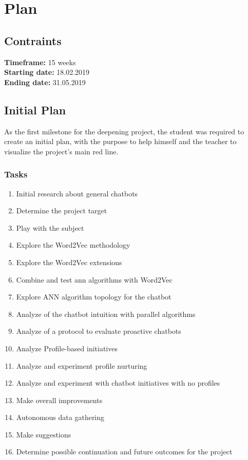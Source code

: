 \chapter{Plan}


\section{Contraints}
\textbf{Timeframe:} 15 weeks\\
\textbf{Starting date:} 18.02.2019\\
\textbf{Ending date:} 31.05.2019

\section{Initial Plan}
As the first milestone for the deepening project, the student was required to create an initial plan, with the purpose to help himself and the teacher to visualize the project's main red line.
\subsection{Tasks}
\begin{enumerate}
    \setlength\itemsep{0em}
    \item Initial research about general chatbots
    \item Determine the project target
    \item Play with the subject
    \item Explore the Word2Vec methodology
    \item Explore the Word2Vec extensions
    \item Combine and test \acrshort{ann} algorithms with Word2Vec
    \item Explore ANN algorithm topology for the chatbot
    \item Analyze of the chatbot intuition with parallel algorithms
    \item Analyze of a protocol to evaluate proactive chatbots
    \item Analyze Profile-based initiatives
    \item Analyze and experiment profile nurturing 
    \item Analyze and experiment with chatbot initiatives with no profiles
    \item Make overall improvements
    \item Autonomous data gathering
    \item Make suggestions
    \item Determine possible continuation and future outcomes for the project
\end{enumerate}

